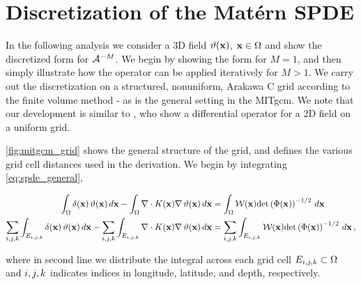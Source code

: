 \section{Discretization of the Mat\'ern SPDE}
\label{sec:discretization_matern}

In the following analysis we consider a 3D field
$\vartheta(\mathbf{x})$, $\mathbf{x}\in\Omega$ and show the discretized form for $\mathcal{A}^{-M}$.
We begin by showing the form for $M=1$, and then simply illustrate how the
operator can be applied iteratively for $M>1$.
We carry out the discretization on a structured, nonuniform, Arakawa C
grid \citep{arakawa_computational_1977}
according to the finite volume method - as is the general setting in the MITgcm.
We note that our development is similar to \citet{fuglstad_exploring_2015},
who show a differential operator for a 2D field on a uniform grid.

\cref{fig:mitgcm_grid} shows the general structure of the grid, and
defines the various grid cell distances used in the derivation.
We begin by integrating \cref{eq:spde_general},
\begin{linenomath*}\begin{equation}
    \begin{aligned}
        \int_{\Omega} \delta(\mathbf{x})\,\vartheta(\mathbf{x})\, d\mathbf{x} -
        \int_{\Omega} \nabla\cdot K(\mathbf{x})\nabla\,\vartheta(\mathbf{x})\,d\mathbf{x}
        &=
        \int_{\Omega} \mathcal{W}(\mathbf{x})\text{det}\left(\Phi(\mathbf{x})\right)^{-1/2} \, d\mathbf{x} \\
        \sum_{{i,j,k}}\int_{E_{i,j,k}} \delta(\mathbf{x})\,\vartheta(\mathbf{x})\, d\mathbf{x} -
        \sum_{{i,j,k}}\int_{E_{i,j,k}} \nabla\cdot K(\mathbf{x})\nabla\,\vartheta(\mathbf{x})\,d\mathbf{x}
        &=
        \sum_{{i,j,k}}\int_{E_{i,j,k}} \mathcal{W}(\mathbf{x})\text{det}\left(\Phi(\mathbf{x})\right)^{-1/2} \, d\mathbf{x} \, ,
    \end{aligned}
    \label{eq:spde_integral}
\end{equation}\end{linenomath*}
where in second line we distribute the integral across each grid cell
$E_{i,j,k}\subset\Omega$ and ${i,j,k}$ indicates indices in longitude, latitude,
and depth, respectively.


